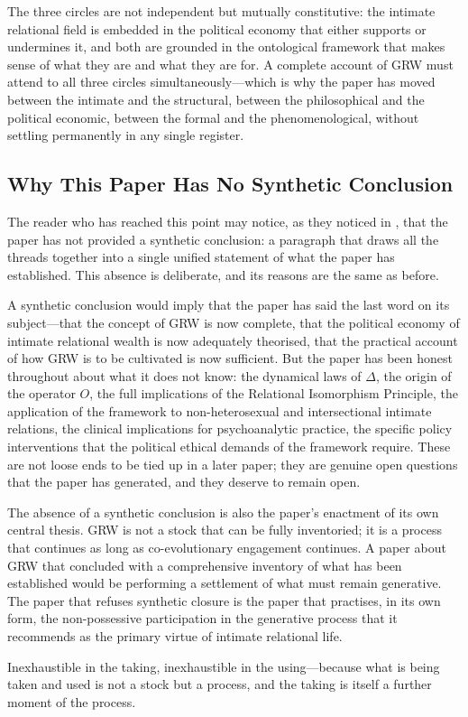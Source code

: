 The three circles are not independent but mutually constitutive: the intimate relational field is embedded in the political economy that either supports or undermines it, and both are grounded in the ontological framework that makes sense of what they are and what they are for. A complete account of GRW must attend to all three circles simultaneously---which is why the paper has moved between the intimate and the structural, between the philosophical and the political economic, between the formal and the phenomenological, without settling permanently in any single register.

\subsection{Why This Paper Has No Synthetic Conclusion}
\label{p15:subsec:nosynthesis}

\noindent
The reader who has reached this point may notice, as they noticed in  \parencite{paperxiv}, that the paper has not provided a synthetic conclusion: a paragraph that draws all the threads together into a single unified statement of what the paper has established. This absence is deliberate, and its reasons are the same as before.

A synthetic conclusion would imply that the paper has said the last word on its subject---that the concept of GRW is now complete, that the political economy of intimate relational wealth is now adequately theorised, that the practical account of how GRW is to be cultivated is now sufficient. But the paper has been honest throughout about what it does not know: the dynamical laws of $\Delta$, the origin of the operator $O$, the full implications of the Relational Isomorphism Principle, the application of the framework to non-heterosexual and intersectional intimate relations, the clinical implications for psychoanalytic practice, the specific policy interventions that the political ethical demands of the framework require. These are not loose ends to be tied up in a later paper; they are genuine open questions that the paper has generated, and they deserve to remain open.

The absence of a synthetic conclusion is also the paper's enactment of its own central thesis. GRW is not a stock that can be fully inventoried; it is a process that continues as long as co-evolutionary engagement continues. A paper about GRW that concluded with a comprehensive inventory of what has been established would be performing a settlement of what must remain generative. The paper that refuses synthetic closure is the paper that practises, in its own form, the non-possessive participation in the generative process that it recommends as the primary virtue of intimate relational life.

 Inexhaustible in the taking, inexhaustible in the using---because what is being taken and used is not a stock but a process, and the taking is itself a further moment of the process.
